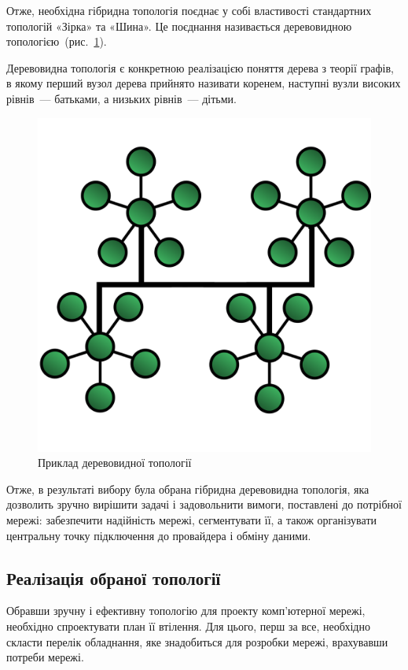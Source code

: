 \documentclass[
  ukrainian,
  simple,
]{eskdnaukvd}
\newlength{\gridunitwidth}
\begin{document}
      Отже, необхідна гібридна топологія поєднає у собі властивості стандартних топологій «Зірка» та «Шина». Це поєднання називається деревовидною топологією~(рис.~\ref{fig:tree-topology}).

      Деревовидна топологія є конкретною реалізацією поняття дерева з теорії графів, в якому перший вузол дерева прийнято називати коренем, наступні вузли високих рівнів~— батьками, а низьких рівнів~— дітьми.

      \begin{figure}[!htbp]
        \centering
        \includegraphics[width = 8 \gridunitwidth]{./assets/04-topology-tree.png}
        \caption{Приклад деревовидної топології}
        \label{fig:tree-topology}
      \end{figure}

      Отже, в результаті вибору була обрана гібридна деревовидна топологія, яка дозволить зручно вирішити задачі і задовольнити вимоги, поставлені до потрібної мережі: забезпечити надійність мережі, сегментувати її, а також організувати центральну точку підключення до провайдера і обміну даними.

    \subsection{Реалізація обраної топології}
      Обравши зручну і ефективну топологію для проекту комп'ютерної мережі, необхідно спроектувати план її втілення. Для цього, перш за все, необхідно скласти перелік обладнання, яке знадобиться для розробки мережі, врахувавши потреби мережі.
\end{document}

